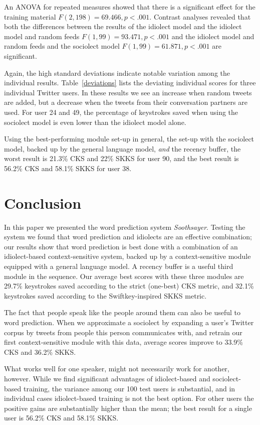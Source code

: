 \documentclass[11pt]{article}
\begin{document}
{An ANOVA for repeated measures showed that there is a significant effect for the training material $F(2,198) = 69.466, p < .001$. Contrast analyses revealed that both the differences between the results of the idiolect model and the idiolect model and random feeds $F(1,99) = 93.471, p < .001$ and the idiolect model and random feeds and the sociolect model $F(1,99) = 61.871, p < .001$ are significant.

Again, the high standard deviations indicate notable variation among the individual results. Table~\ref{deviations} lists the deviating individual scores for three individual Twitter users. In these results we see an increase when random tweets are added, but a decrease when the tweets from their conversation partners are used. For user 24 and 49, the percentage of keystrokes saved when using the sociolect model is even lower than the idiolect model alone.  

Using the best-performing module set-up in general, the set-up with the sociolect model, backed up by the general language model, \emph{and} the recency buffer, the worst result is 21.3\% CKS and 22\% SKKS for user 90, and the best result is 56.2\% CKS and 58.1\% SKKS for user 38.


\section{Conclusion} \label{conclusion}

In this paper we presented the word prediction system \emph{Soothsayer}. Testing the system we found that word prediction and idiolects are an effective combination; our results show that word prediction is best done with a combination of an idiolect-based context-sensitive system, backed up by a context-sensitive module equipped with a general language model. A recency buffer is a useful third module in the sequence. Our average best scores with these three modules are 29.7\% keystrokes saved according to the strict (one-best) CKS metric, and 32.1\% keystrokes saved according to the Swiftkey-inspired SKKS metric. 

The fact that people speak like the people around them can also be useful to word prediction. When we approximate a sociolect by expanding a user's Twitter corpus by tweets from people this person communicates with, and retrain our first context-sensitive module with this data, average scores improve to 33.9\% CKS and 36.2\% SKKS.

What works well for one speaker, might not necessarily work for another, however. While we find significant advantages of idiolect-based and sociolect-based training, the variance among our 100 test users is substantial, and in individual cases idiolect-based training is not the best option. For other users the positive gains are substantially higher than the mean; the best result for a single user is 56.2\% CKS and 58.1\% SKKS.

}
\end{document}
